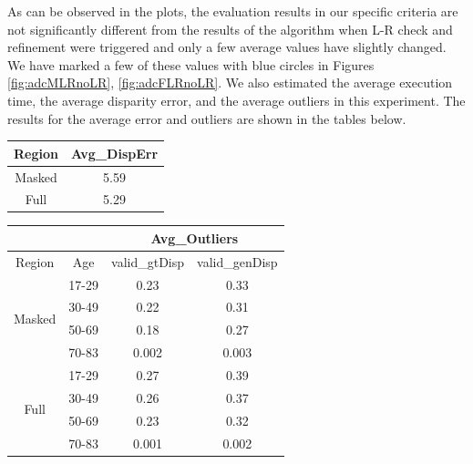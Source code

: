 As can be observed in the plots, the evaluation results in our specific criteria 
are not significantly different from the results of the algorithm when L-R check and refinement were triggered
and only a few average values have slightly changed. We have marked a few of these values with blue circles in Figures \ref{fig:adcMLRnoLR}, \ref{fig:adcFLRnoLR}. \newline
We also estimated the average execution time, the average disparity error, and the average outliers in this experiment. The results for 
the average error and outliers are shown in the tables below. \newline

\begin{minipage}{\linewidth}
\begin{center}
\label{tab:adcerrNref}
\begin{tabular}{|c|c|}
\hline
Region & Avg\_DispErr \\ \hline
Masked & 5.59 \\  \hline
Full & 5.29 \\ \hline
\end{tabular}
\end{center}
\end{minipage} \newline \newline

\begin{minipage}{\linewidth}
\begin{center}
\label{tab:adcoutlNref}
\begin{tabular}{ |c|c|c|c| }
\hline
\multicolumn{2}{|c}{} & \multicolumn{2}{|c|}{Avg\_Outliers} \\
\hline
Region & Age &  valid\_gtDisp & valid\_genDisp \\ \hline
\multirow{4}{*}{Masked} & 17-29 & 0.23 & 0.33 \\
& 30-49 & 0.22 & 0.31 \\
& 50-69 & 0.18 & 0.27 \\
& 70-83 & 0.002 & 0.003 \\ \hline
\multirow{4}{*}{Full} & 17-29 & 0.27 & 0.39 \\
& 30-49 & 0.26 & 0.37 \\
& 50-69 & 0.23 & 0.32 \\
& 70-83 & 0.001 & 0.002 \\ \hline
\end{tabular}
\end{center}
\end{minipage} \newline \newline

